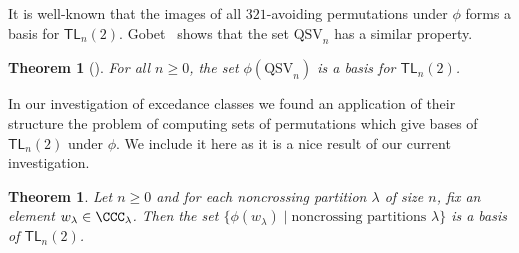 \documentclass[submission]{FPSAC2024}
\newtheorem{thm}[equation]{Theorem}
\theoremstyle{definition}
\theoremstyle{remark}
\newtheorem{rem}[equation]{Remark}
\numberwithin{equation}{section}
\newcommand{\TL}{\mathsf{TL}}
\newcommand{\QSV}{\mathrm{QSV}}
\begin{document}
It is well-known that the images of all $321$-avoiding permutations under $\phi$ forms a basis for $\TL_{n}(2)$.  
Gobet~\cite{Gobet} shows that the set $\QSV_{n}$ has a similar property.


\begin{thm}[{\cite[Theorem 7.21]{Gobet}}]
\label{thm:TLbasis}
For all $n \ge 0$, the set $\phi(\QSV_{n})$ is a basis for $\TL_{n}(2)$.
\end{thm}

%

In our investigation of excedance classes we found an application of their structure the problem of computing sets of permutations which give bases of $\TL_{n}(2)$ under $\phi$.  
We include it here  as it is a nice result of our current investigation.

\begin{thm}
\label{thm:TLbases}
Let $n \ge 0$ and for each noncrossing partition $\lambda$ of size $n$, fix an element $w_{\lambda} \in \CCC_{\lambda}$. Then the set $\{\phi(w_{\lambda}) \;|\; \text{noncrossing partitions $\lambda$}\}$ is a basis of $\TL_{n}(2)$.
\end{thm}
\end{document}
